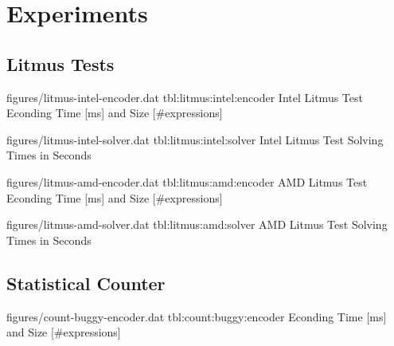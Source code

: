 
\section{Experiments}

\subsection{Litmus Tests}

\newcommand{\StatsTableRowHeader}[1]{\hyperref[tbl:#1]{\StrBehind[2]{#1}{:}}}


\EncoderStatsTable
  {figures/litmus-intel-encoder.dat}
  {tbl:litmus:intel:encoder}
  {Intel Litmus Test Econding Time [ms] and Size [\#expressions]}


\SolverStatsTable
  {figures/litmus-intel-solver.dat}
  {tbl:litmus:intel:solver}
  {Intel Litmus Test Solving Times in Seconds}

\newpage


\EncoderStatsTable
  {figures/litmus-amd-encoder.dat}
  {tbl:litmus:amd:encoder}
  {AMD Litmus Test Econding Time [ms] and Size [\#expressions]}


\SolverStatsTable
  {figures/litmus-amd-solver.dat}
  {tbl:litmus:amd:solver}
  {AMD Litmus Test Solving Times in Seconds}

\newpage

\subsection{Statistical Counter}

\renewcommand{\StatsTableRowHeader}[1]{%
\StrBehind{#1}{:}[\SplitColon]%
\StrBehind{\SplitColon}{.}[\SplitDot]%
\StrSubstitute{\SplitDot}{.}{ }%
}


\EncoderStatsTable
  {figures/count-buggy-encoder.dat}
  {tbl:count:buggy:encoder}
  {Econding Time [ms] and Size [\#expressions]}


